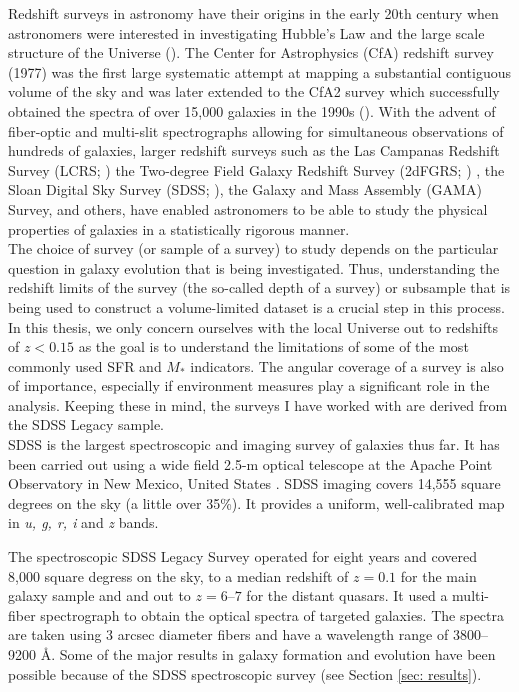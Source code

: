 Redshift surveys in astronomy have their origins in the early 20th
century when astronomers were interested in investigating Hubble's Law
and the large scale structure of the Universe
(\citealt{hubble31a}). The Center for Astrophysics (CfA) redshift
survey (1977) was the first large systematic attempt at mapping a
substantial contiguous volume of the sky and was later extended to the
CfA2 survey which successfully obtained the spectra of over 15,000
galaxies in the 1990s (\citealt{huchra95a}). With the advent of
fiber-optic and multi-slit spectrographs allowing for simultaneous
observations of hundreds of galaxies, larger redshift surveys such as
the Las Campanas Redshift Survey (LCRS; \citealt{shectman96a}) the
Two-degree Field Galaxy Redshift Survey (2dFGRS; \citealt{colless01a})
, the Sloan Digital Sky Survey (SDSS; \citealt{2000AJ....120.1579Y,
  eisenstein11a, blanton17a}), the Galaxy and Mass Assembly (GAMA)
Survey, and others, have enabled astronomers to be able to study the
physical properties of galaxies in a statistically rigorous manner.\\

The choice of survey (or sample of a survey) to study depends on the
particular question in galaxy evolution that is being
investigated. Thus, understanding the redshift limits of the survey
(the so-called depth of a survey) or subsample that is being used to
construct a volume-limited dataset is a crucial step in this
process. In this thesis, we only concern ourselves with the local
Universe out to redshifts of $z < 0.15$ as the goal is to understand
the limitations of some of the most commonly used SFR and $M_{*}$
indicators. The angular coverage of a survey is also of importance,
especially if environment measures play a significant role in the
analysis. Keeping these in mind, the surveys I have worked with are
derived from the SDSS Legacy sample.\\

SDSS is the largest spectroscopic and imaging survey of galaxies thus
far. It has been carried out using a wide field 2.5-m optical
telescope at the Apache Point Observatory \citet{2006AJ....131.2332G}
in New Mexico, United States \citep{2000AJ....120.1579Y,
  2002AJ....124.1810S}. SDSS imaging covers 14,555 square degrees on
the sky (a little over 35\%).  It provides a uniform, well-calibrated
map in \emph{u, g, r, i} and \emph{z} bands.

The spectroscopic SDSS Legacy Survey operated for eight years and
covered 8,000 square degress on the sky, to a median redshift of $z=
0.1$ for the main galaxy sample and and out to $z = 6$--$7$ for the
distant quasars.  It used a multi-fiber spectrograph
\citep{smee_multi-object_2013} to obtain the optical spectra of
targeted galaxies. The spectra are taken using 3 arcsec diameter
fibers and have a wavelength range of 3800--9200 \AA. Some of the
major results in galaxy formation and evolution have been possible
because of the SDSS spectroscopic survey (see Section \ref{sec:
  results}).

